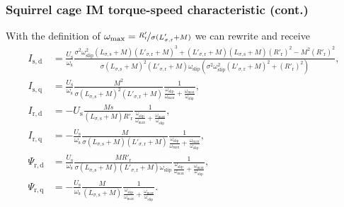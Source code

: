 \begin{frame}
	\frametitle{Squirrel cage IM torque-speed characteristic (cont.)}
	With the definition of $\omega_\mathrm{max}=\nicefrac{R'_\mathrm{r}}{\sigma (L'_{\sigma,\mathrm{r}} +M)}$ we can rewrite and receive \pause
	\small
	\begin{align}
		I_\mathrm{s,d}    & = \frac{U_\mathrm{s}}{\omega_\mathrm{s}}\frac{\sigma^2 \omega^2_\mathrm{slip} (L_{\sigma,\mathrm{s}} +M)(L'_{\sigma,\mathrm{r}} +M)^3 + (L'_{\sigma,\mathrm{r}} +M)(L_{\sigma,\mathrm{s}} +M)(R'_\mathrm{r})^2 - M^2(R'_\mathrm{r})^2}{\sigma (L_{\sigma,\mathrm{s}} +M)^2(L'_{\sigma,\mathrm{r}} +M) \omega_\mathrm{slip}(\sigma^2 \omega^2_\mathrm{slip}(L'_{\sigma,\mathrm{r}} +M)^2 + (R'_\mathrm{r})^2)}, \\
		I_\mathrm{s,q}    & = \frac{U_\mathrm{s}}{\omega_\mathrm{s}}\frac{M^2}{\sigma (L_{\sigma,\mathrm{s}} +M)^2(L'_{\sigma,\mathrm{r}} +M)}\frac{1}{\frac{\omega_\mathrm{slip}}{\omega_\mathrm{max}} + \frac{\omega_\mathrm{max}}{\omega_\mathrm{slip}}},                                                                                                                                                                               \\
		I_\mathrm{r,d}    & = -U_\mathrm{s}\frac{M s}{(L_{\sigma,\mathrm{s}} +M)R'_\mathrm{r}}\frac{1}{\frac{\omega_\mathrm{slip}}{\omega_\mathrm{max}} + \frac{\omega_\mathrm{max}}{\omega_\mathrm{slip}}},                                                                                                                                                                                                                               \\
		I_\mathrm{r,q}    & = -\frac{U_\mathrm{s}}{\omega_\mathrm{s}} \frac{M}{\sigma (L_{\sigma,\mathrm{s}} +M)(L'_{\sigma,\mathrm{r}} +M)}\frac{1}{\frac{\omega_\mathrm{slip}}{\omega_\mathrm{max}} + \frac{\omega_\mathrm{max}}{\omega_\mathrm{slip}}},                                                                                                                                                                                 \\
		\Psi_\mathrm{r,d} & = \frac{U_\mathrm{s}}{\omega_\mathrm{s}}\frac{M R'_\mathrm{r}}{\sigma (L_{\sigma,\mathrm{s}} +M) (L'_{\sigma,\mathrm{r}} +M)\omega_\mathrm{slip}}\frac{1}{\frac{\omega_\mathrm{slip}}{\omega_\mathrm{max}} + \frac{\omega_\mathrm{max}}{\omega_\mathrm{slip}}},                                                                                                                                                \\
		\Psi_\mathrm{r,q} & = -\frac{U_\mathrm{s}}{\omega_\mathrm{s}}\frac{M}{(L_{\sigma,\mathrm{s}} +M)}\frac{1}{\frac{\omega_\mathrm{slip}}{\omega_\mathrm{max}} + \frac{\omega_\mathrm{max}}{\omega_\mathrm{slip}}}.
	\end{align}
	\normalsize
\end{frame}

